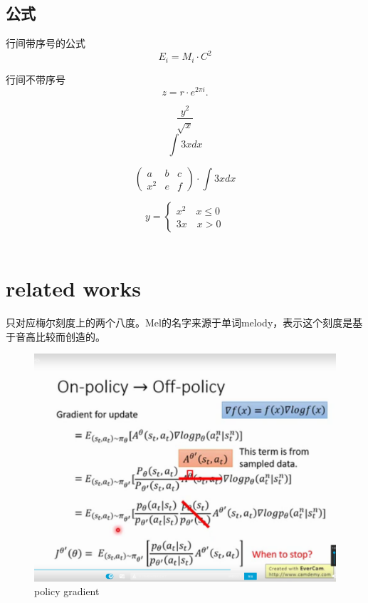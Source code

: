 \documentclass[UTF8]{ctexart} %
\begin{document}
		\subsection{公式}
			行间带序号的公式
			\begin{equation}
				E_i=M_i\cdot C^2
			\end{equation}
			
			行间不带序号
			\[ z = r\cdot e^{2\pi i}. \]
			
			\[\frac{y^2}{\sqrt{x}}\]
			\[\int{3xdx}\]
			
			\[  \begin{pmatrix}a&b&c\\x^2&e&f\end{pmatrix} \cdot \int{3xdx}  \]
			
			\[y=\begin{cases}
			x^2\quad x\leq0\\
			3x\quad x>0
			\end{cases}\]		
	\\[3ex]  %
			
	\section{related works}
	只对应梅尔刻度上的两个八度。Mel的名字来源于单词melody，表示这个刻度是基于音高比较而创造的。	
	
	\begin{figure}[!htb]
	\centering \includegraphics[scale=0.2]{pg.png}
	\caption{policy gradient}
	\end{figure}
	
\end{document}

